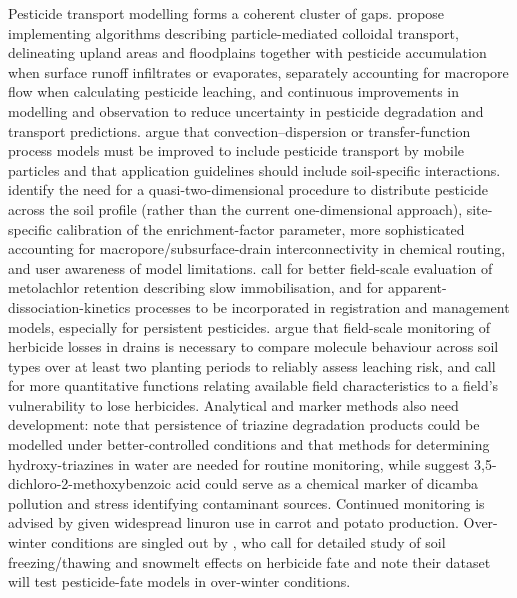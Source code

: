 Pesticide transport modelling forms a coherent cluster of gaps. \textcite{Wendell2024} propose implementing algorithms describing particle-mediated colloidal transport, delineating upland areas and floodplains together with pesticide accumulation when surface runoff infiltrates or evaporates, separately accounting for macropore flow when calculating pesticide leaching, and continuous improvements in modelling and observation to reduce uncertainty in pesticide degradation and transport predictions. \textcite{Zehe2001} argue that convection--dispersion or transfer-function process models must be improved to include pesticide transport by mobile particles and that application guidelines should include soil-specific interactions. \textcite{Fox2007b} identify the need for a quasi-two-dimensional procedure to distribute pesticide across the soil profile (rather than the current one-dimensional approach), site-specific calibration of the enrichment-factor parameter, more sophisticated accounting for macropore/subsurface-drain interconnectivity in chemical routing, and user awareness of model limitations. \textcite{Novak2003} call for better field-scale evaluation of metolachlor retention describing slow immobilisation, and for apparent-dissociation-kinetics processes to be incorporated in registration and management models, especially for persistent pesticides. \textcite{Dousset2004} argue that field-scale monitoring of herbicide losses in drains is necessary to compare molecule behaviour across soil types over at least two planting periods to reliably assess leaching risk, and \textcite{Leu2004} call for more quantitative functions relating available field characteristics to a field's vulnerability to lose herbicides. Analytical and marker methods also need development: \textcite{MUIR1978} note that persistence of triazine degradation products could be modelled under better-controlled conditions and that methods for determining hydroxy-triazines in water are needed for routine monitoring, while \textcite{Heaven2012} suggest 3,5-dichloro-2-methoxybenzoic acid could serve as a chemical marker of dicamba pollution and stress identifying contaminant sources. Continued monitoring is advised by \textcite{Gordon2005} given widespread linuron use in carrot and potato production. Over-winter conditions are singled out by \textcite{Siimes2006}, who call for detailed study of soil freezing/thawing and snowmelt effects on herbicide fate and note their dataset will test pesticide-fate models in over-winter conditions.

